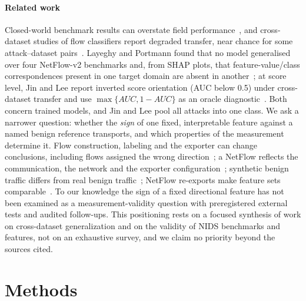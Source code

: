 \documentclass[preprint,12pt]{elsarticle}
\begin{document}
\paragraph{Related work} Closed-world benchmark results can overstate field performance~\cite{sommer2010closedworld}, and cross-dataset studies of flow classifiers report degraded transfer, near chance for some attack--dataset pairs~\cite{dhooge2020inter,cantone2024crossdataset,elangovan2026crossdataset}. Layeghy and Portmann found that no model generalised over four NetFlow-v2 benchmarks and, from SHAP plots, that feature-value/class correspondences present in one target domain are absent in another~\cite{layeghy2022generalisability}; at score level, Jin and Lee report inverted score orientation (AUC below 0.5) under cross-dataset transfer and use $\max\{AUC,1-AUC\}$ as an oracle diagnostic~\cite{jin2026benchmark}. Both concern trained models, and Jin and Lee pool all attacks into one class. We ask a narrower question: whether the \emph{sign} of one fixed, interpretable feature against a named benign reference transports, and which properties of the measurement determine it. Flow construction, labeling and the exporter can change conclusions, including flows assigned the wrong direction~\cite{engelen2021troubleshooting,flood2024smells,pinto2024flowexporter}; a NetFlow reflects the communication, the network and the exporter configuration~\cite{apruzzese2022cross}; synthetic benign traffic differs from real benign traffic~\cite{layeghy2024benchmarking}; NetFlow re-exports make feature sets comparable~\cite{sarhan2021nfv2}. To our knowledge the sign of a fixed directional feature has not been examined as a measurement-validity question with preregistered external tests and audited follow-ups. This positioning rests on a focused synthesis of work on cross-dataset generalization and on the validity of NIDS benchmarks and features, not on an exhaustive survey, and we claim no priority beyond the sources cited.

\section{Methods}\label{sec:methods}
\end{document}
